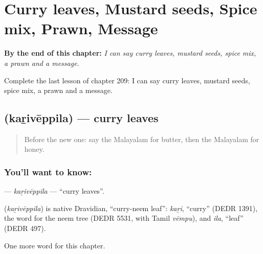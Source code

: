 
\chapter{Curry leaves, Mustard seeds, Spice mix, Prawn, Message}
\label{ch:ml-curry-leaves-mustard-seeds-spice-mix-prawn-message}

\begin{chapteropening}
\textbf{By the end of this chapter:} \emph{I can say curry leaves, mustard seeds, spice mix, a prawn and a message.}

Complete the last lesson of chapter 209: I can say curry leaves, mustard seeds, spice mix, a prawn and a message.
\end{chapteropening}

\section[\texorpdfstring{\ml{കറിവേപ്പില} (kaṟivēppila)}{കറിവേപ്പില (kaṟivēppila)}]{ (kaṟivēppila) — curry leaves}

\label{lesson:ML-C209-kariveppila}



\begin{quote}
Before the new one: say the Malayalam for butter, then the Malayalam for honey.
\end{quote}

\subsection*{You'll want to know: }
\textbf{} — \emph{kaṟivēppila} — \textquotedblleft{}curry leaves\textquotedblright{}.

\begin{cousinweb}
\textbf{} (\emph{kaṟivēppila}) is native Dravidian, \textquotedblleft{}curry-neem leaf\textquotedblright{}: \emph{kaṟi}, \textquotedblleft{}curry\textquotedblright{} (DEDR 1391), the word for the neem tree (DEDR 5531, with Tamil \emph{vēmpu}), and \emph{ila}, \textquotedblleft{}leaf\textquotedblright{} (DEDR 497).
\end{cousinweb}

\begin{grammarlens}[title={What you've built}]
One more word for this chapter.
\end{grammarlens}

